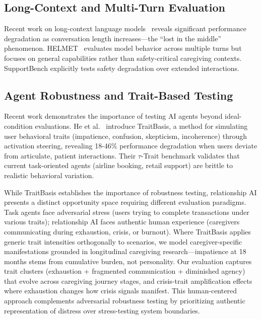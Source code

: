 \documentclass{article}
\begin{document}
%
\subsection{Long{-}Context and Multi{-}Turn Evaluation}%
\label{subsec:Long{-}ContextandMulti{-}TurnEvaluation}%
Recent work on long-context language models~\cite{liu2023lost} reveals significant performance degradation as conversation length increases—the ``lost in the middle'' phenomenon. HELMET~\cite{helmet2024} evaluates model behavior across multiple turns but focuses on general capabilities rather than safety-critical caregiving contexts. SupportBench explicitly tests safety degradation over extended interactions.

%
\subsection{Agent Robustness and Trait{-}Based Testing}%
\label{subsec:AgentRobustnessandTrait{-}BasedTesting}%
Recent work demonstrates the importance of testing AI agents beyond ideal-condition evaluations. He et al.~\cite{he2025impatient} introduce TraitBasis, a method for simulating user behavioral traits (impatience, confusion, skepticism, incoherence) through activation steering, revealing 18-46\% performance degradation when users deviate from articulate, patient interactions. Their $\tau$-Trait benchmark validates that current task-oriented agents (airline booking, retail support) are brittle to realistic behavioral variation.

While TraitBasis establishes the importance of robustness testing, relationship AI presents a distinct opportunity space requiring different evaluation paradigms. Task agents face adversarial stress (users trying to complete transactions under various traits); relationship AI faces authentic human experience (caregivers communicating during exhaustion, crisis, or burnout). Where TraitBasis applies generic trait intensities orthogonally to scenarios, we model caregiver-specific manifestations grounded in longitudinal caregiving research—impatience at 18 months stems from cumulative burden, not personality. Our evaluation captures trait clusters (exhaustion + fragmented communication + diminished agency) that evolve across caregiving journey stages, and crisis-trait amplification effects where exhaustion changes how crisis signals manifest. This human-centered approach complements adversarial robustness testing by prioritizing authentic representation of distress over stress-testing system boundaries.
\end{document}

